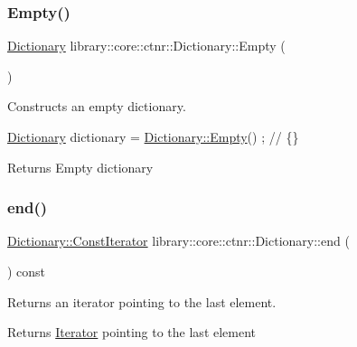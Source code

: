 \subsubsection{\texorpdfstring{Empty()}{Empty()}}
{\footnotesize\ttfamily \hyperlink{classlibrary_1_1core_1_1ctnr_1_1_dictionary}{Dictionary} library\+::core\+::ctnr\+::\+Dictionary\+::\+Empty (\begin{DoxyParamCaption}{ }\end{DoxyParamCaption})\hspace{0.3cm}{\ttfamily [static]}}



Constructs an empty dictionary. 


\begin{DoxyCode}
\hyperlink{classlibrary_1_1core_1_1ctnr_1_1_dictionary_a823a08112d9ee271f9fa5833f030ea1a}{Dictionary} dictionary = \hyperlink{classlibrary_1_1core_1_1ctnr_1_1_dictionary_aae75dbcf8229b0a73c716010a5854991}{Dictionary::Empty}() ; \textcolor{comment}{// \{\}}
\end{DoxyCode}


\begin{DoxyReturn}{Returns}
Empty dictionary 
\end{DoxyReturn}
\mbox{\label{classlibrary_1_1core_1_1ctnr_1_1_dictionary_ace2fb3bdb88a059090e8b0265d97e57e}} 
\subsubsection{\texorpdfstring{end()}{end()}\hspace{0.1cm}{\footnotesize\ttfamily [1/2]}}
{\footnotesize\ttfamily \hyperlink{classlibrary_1_1core_1_1ctnr_1_1_dictionary_1_1_const_iterator}{Dictionary\+::\+Const\+Iterator} library\+::core\+::ctnr\+::\+Dictionary\+::end (\begin{DoxyParamCaption}{ }\end{DoxyParamCaption}) const}



Returns an iterator pointing to the last element. 

\begin{DoxyReturn}{Returns}
\hyperlink{classlibrary_1_1core_1_1ctnr_1_1_dictionary_1_1_iterator}{Iterator} pointing to the last element 
\end{DoxyReturn}
\mbox{\label{classlibrary_1_1core_1_1ctnr_1_1_dictionary_a16ed18981bcf7ffdc7308801cc4b9d56}} 
